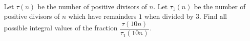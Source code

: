 Let $\tau(n)$ be the number of positive divisors of $n$. Let $\tau_1(n)$ be the number of positive divisors of $n$ which have remainders $1$ when divided by $3$. Find all possible integral values of the fraction $\dfrac{\tau(10n)}{\tau_1(10n)}$.
